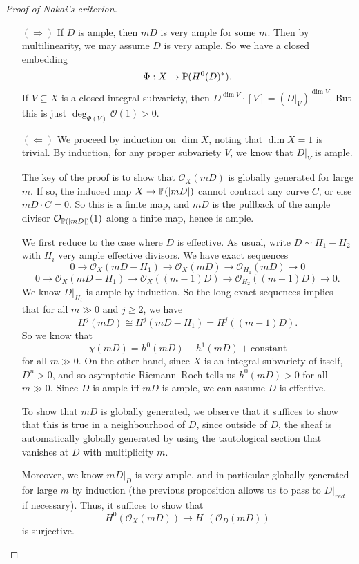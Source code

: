 \documentclass[a4paper]{article}
\begin{document}
\begin{proof}[Proof of Nakai's criterion]\leavevmode
  \begin{itemize}
    \item[$(\Rightarrow)$] If $D$ is ample, then $mD$ is very ample for some $m$. Then by multilinearity, we may assume $D$ is very ample. So we have a closed embedding
      \[
        \Phi: X \to \P(H^0(D)^*).
      \]
      If $V \subseteq X$ is a closed integral subvariety, then $D^{\dim V} \cdot [V] = (D|_V)^{\dim V}$. But this is just $\deg_{\Phi(V)} \mathcal{O}(1) > 0$.
    \item[$(\Leftarrow)$] We proceed by induction on $\dim X$, noting that $\dim X = 1$ is trivial. By induction, for any proper subvariety $V$, we know that $D|_V$ is ample.

      The key of the proof is to show that $\mathcal{O}_X(mD)$ is globally generated for large $m$. If so, the induced map $X \to \P(|mD|)$ cannot contract any curve $C$, or else $mD \cdot C = 0$. So this is a finite map, and $mD$ is the pullback of the ample divisor $\mathcal{O}_{\P(|mD|)}(1)$ along a finite map, hence is ample.

      We first reduce to the case where $D$ is effective. As usual, write $D \sim H_1 - H_2$ with $H_i$ very ample effective divisors. We have exact sequences
      \[
        0 \to \mathcal{O}_X(mD - H_1) \to \mathcal{O}_X(mD) \to \mathcal{O}_{H_1}(mD) \to 0
      \]
      \[
        0 \to \mathcal{O}_X(mD - H_1) \to \mathcal{O}_X((m - 1)D) \to \mathcal{O}_{H_2}((m - 1)D) \to 0.
      \]
      We know $D|_{H_i}$ is ample by induction. So the long exact sequences implies that for all $m \gg 0$ and $j \geq 2$, we have
      \[
        H^j(mD) \cong H^j(mD - H_1) = H^j((m - 1)D).
      \]
      So we know that
      \[
        \chi(mD) = h^0(mD) - h^1(mD) + \text{constant}
      \]
      for all $m \gg 0$. On the other hand, since $X$ is an integral subvariety of itself, $D^n > 0$, and so asymptotic Riemann--Roch tells us $h^0(mD) > 0$ for all $m \gg 0$. Since $D$ is ample iff $mD$ is ample, we can assume $D$ is effective.

      To show that $mD$ is globally generated, we observe that it suffices to show that this is true in a neighbourhood of $D$, since outside of $D$, the sheaf is automatically globally generated by using the tautological section that vanishes at $D$ with multiplicity $m$.

      Moreover, we know $mD|_D$ is very ample, and in particular globally generated for large $m$ by induction (the previous proposition allows us to pass to $D|_{red}$ if necessary). Thus, it suffices to show that
      \[
        H^0(\mathcal{O}_X(mD)) \to H^0(\mathcal{O}_D(mD))
      \]
      is surjective.


\end{itemize}
\end{proof}
\end{document}
